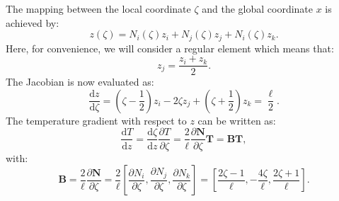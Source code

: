 \documentclass[10pt, a4paper, twoside, headinclude,footinclude, BCOR5mm]{scrartcl}
\begin{document}
The mapping between the local coordinate \(\zeta\) and the global coordinate \(x\) is achieved by:
\begin{equation*}
  z(\zeta) = N_i(\zeta)z_i + N_j(\zeta)z_j + N_i(\zeta)z_k.
\end{equation*}
Here, for convenience, we will consider a regular element which means that:
\begin{equation*}
  z_j = \frac{z_i + z_k}{2}.
\end{equation*}
The  Jacobian is now evaluated as:
\begin{equation*}
  \frac{\text{d}z}{\text{d}\zeta} = (\zeta - \frac{1}{2})z_i -
                                    2\zeta z_j +
                                    (\zeta + \frac{1}{2})z_k =
                                    \frac{\ell}{2}.
\end{equation*}
The temperature gradient with respect to \(z\) can be written as:
\begin{equation*}
  \frac{\text{d} T}{\text{d}z} =
  \frac{\text{d}\zeta}{\text{d}z} \frac{\partial T}{\partial \zeta} =
  \frac{2}{\ell}\frac{\partial \mathbf{N}}{\partial \zeta} \mathbf{T} =
  \mathbf{B}\mathbf{T},
\end{equation*}
with:
\begin{equation*}
\mathbf{B} = \frac{2}{\ell}\frac{\partial \mathbf{N}}{\partial\zeta}= \frac{2}{\ell}
\left[\frac{\partial N_i}{\partial \zeta}, \frac{\partial N_j}{\partial \zeta}, \frac{\partial N_k}{\partial \zeta}\right] =
\left[\frac{2\zeta - 1}{\ell}, -\frac{4\zeta}{\ell}, \frac{2\zeta + 1}{\ell}\right].
\end{equation*}
\end{document}
